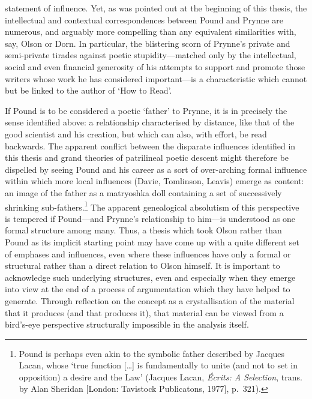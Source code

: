 \documentclass[]{article}
\begin{document}
statement of influence. Yet, as was pointed out at the beginning of this
thesis, the intellectual and contextual correspondences between Pound
and Prynne are numerous, and arguably more compelling than any
equivalent similarities with, say, Olson or Dorn. In particular, the
blistering scorn of Prynne's private and semi-private tirades against
poetic stupidity---matched only by the intellectual, social and even
financial generosity of his attempts to support and promote those
writers whose work he has considered important---is a characteristic
which cannot but be linked to the author of `How to Read'.

If Pound is to be considered a poetic `father' to Prynne, it is in
precisely the sense identified above: a relationship characterised by
distance, like that of the good scientist and his creation, but which
can also, with effort, be read backwards. The apparent conflict between
the disparate influences identified in this thesis and grand theories of
patrilineal poetic descent might therefore be dispelled by seeing Pound
and his career as a sort of over-arching formal influence within which
more local influences (Davie, Tomlinson, Leavis) emerge as content: an
image of the father as a matryoshka doll containing a set of
successively shrinking sub-fathers.\footnote{Pound is perhaps even akin
  to the symbolic father described by Jacques Lacan, whose `true
  function {[}\ldots{}{]} is fundamentally to unite (and not to set in
  opposition) a desire and the Law' (Jacques Lacan, \emph{Écrits: A
  Selection}, trans. by Alan Sheridan {[}London: Tavistock Publicatons,
  1977{]}, p.~321).} The apparent genealogical absolutism of this
perspective is tempered if Pound---and Prynne's relationship to him---is
understood as one formal structure among many. Thus, a thesis which took
Olson rather than Pound as its implicit starting point may have come up
with a quite different set of emphases and influences, even where these
influences have only a formal or structural rather than a direct
relation to Olson himself. It is important to acknowledge such
underlying structures, even and especially when they emerge into view at
the end of a process of argumentation which they have helped to
generate. Through reflection on the concept as a crystallisation of the
material that it produces (and that produces it), that material can be
viewed from a bird's-eye perspective structurally impossible in the
analysis itself.
\end{document}
